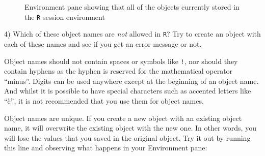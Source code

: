 \documentclass[
  letterpaper,
  DIV=11,
  numbers=noendperiod,
  oneside]{scrreprt}
\begin{document}
\begin{figure}


\caption{\label{fig-MultipleObjectsEnvironmentPane}Environment pane
showing that all of the objects currently stored in the \texttt{R}
session environment}

\end{figure}%

\begin{tcolorbox}[enhanced jigsaw, leftrule=.75mm, arc=.35mm, opacityback=0, rightrule=.15mm, left=2mm, colback=white, title=\textcolor{quarto-callout-tip-color}{\faLightbulb}\hspace{0.5em}{Quiz time!}, colframe=quarto-callout-tip-color-frame, coltitle=black, colbacktitle=quarto-callout-tip-color!10!white, bottomtitle=1mm, toptitle=1mm, titlerule=0mm, bottomrule=.15mm, opacitybacktitle=0.6, breakable, toprule=.15mm]

4) Which of these object names are \emph{not} allowed in \texttt{R}? Try
to create an object with each of these names and see if you get an error
message or not.

\end{tcolorbox}

Object names should not contain spaces or symbols like \texttt{!}, nor
should they contain hyphens as the hyphen is reserved for the
mathematical operator ``minus''. Digits can be used anywhere except at
the beginning of an object name. And whilst it is possible to have
special characters such as accented letters like ``è'', it is not
recommended that you use them for object names.

Object names are unique. If you create a new object with an existing
object name, it will overwrite the existing object with the new one. In
other words, you will lose the values that you saved in the original
object. Try it out by running this line and observing what happens in
your Environment pane:
\end{document}
